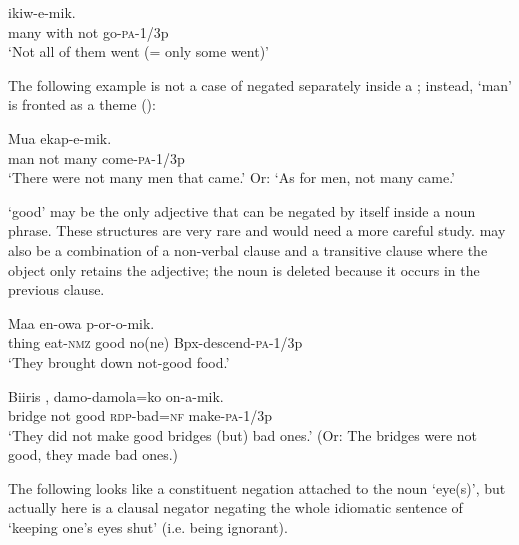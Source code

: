\ea%
\label{ex:6:x668}
\gll {}      ikiw-e-mik. \\
many  with  not  go-\textsc{pa}-1/3p\\
\glt `Not all of them went (= only some went)'
\z

The following example is not a case of  negated separately inside a ; instead,  `man' is fronted as a theme ():

\ea%
\label{ex:6:x1150}
\gll Mua      ekap-e-mik. \\
man  not  many  come-\textsc{pa}-1/3p\\
\glt `There were not many men that came.' Or: `As for men, not many came.'
\z

 `good' may be the only adjective that can be negated by itself inside a noun phrase. These structures are very rare and would need a more careful study.  may also be a combination of a non-verbal clause and a transitive clause where the object  only retains the adjective; the noun is deleted because it occurs in the previous clause.

\ea%
\label{ex:6:x1106}
\gll Maa  en-owa      p-or-o-mik. \\
thing  eat-\textsc{nmz}  good  no(ne)  Bpx-descend-\textsc{pa}-1/3p\\
\glt `They brought down not-good food.'
\z

\ea%
\label{ex:6:x1107}
\gll Biiris    ,  damo-damola=ko  on-a-mik. \\
bridge  not  good  \textsc{rdp}-bad=\textsc{nf}  make-\textsc{pa}-1/3p\\
\glt `They did not make good bridges (but) bad ones.' (Or: The bridges were not good, they made bad ones.) 
\z

The following looks like a constituent negation attached to the noun  `eye(s)', but actually   here is a clausal negator negating the whole idiomatic sentence of `keeping one's eyes shut' (i.e. being ignorant).

